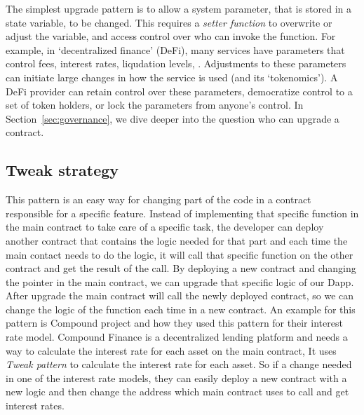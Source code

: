 The simplest upgrade pattern is to allow a system parameter, that is stored in a state variable, to be changed. This requires a \textit{setter function} to overwrite or adjust the variable, and access control over who can invoke the function. For example, in `decentralized finance' (DeFi), many services have parameters that control fees, interest rates, liqudation levels, \etc. Adjustments to these parameters can initiate large changes in how the service is used (and its `tokenomics'). A DeFi provider can retain control over these parameters, democratize control to a set of token holders, or  lock the parameters from anyone's control. In Section~\ref{sec:governance}, we dive deeper into the question who can upgrade a contract. 


\subsection{Tweak strategy} 

This pattern is an easy way for changing part of the code in a contract responsible for a specific feature. Instead of implementing that specific function in the main contract to take care of a specific task, the developer can deploy another contract that contains the logic needed for that part and each time the main contact needs to do the logic, it will call that specific function on the other contract and get the result of the call. By deploying a new contract and changing the pointer in the main contract, we can upgrade that specific logic of our Dapp. After upgrade the main contract will call the newly deployed contract, so we can change the logic of the function each time in a new contract.
An example for this pattern is Compound project and how they used this pattern for their interest rate model. Compound Finance is a decentralized lending platform and needs a way to calculate the interest rate for each asset on the main contract, It uses \textit{Tweak pattern} to calculate the interest rate for each asset. So if a change needed in one of the interest rate models, they can easily deploy a new contract with a new logic and then change the address which main contract uses to call and get interest rates.



